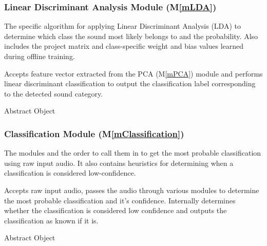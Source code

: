 \documentclass[12pt, titlepage]{article}
\newcommand{\mref}[1]{M\ref{#1}}
\begin{document}
\subsubsection{Linear Discriminant Analysis Module (\mref{mLDA})}
\begin{description}[labelindent=0.5cm]
  \item[Secrets:] The specific algorithm for applying Linear Discriminant
  Analysis (LDA) to determine which class the sound most likely belongs to and
  the probability. Also includes the project matrix and class-specific weight
  and bias values learned during offline training.
  \item[Services:] Accepts feature vector extracted from the PCA (\mref{mPCA})
  module and performs linear discriminant classification to output the
  classification label corresponding to the detected sound category. 
  \item[Implemented By:] \progname
  \item[Type of Module:] Abstract Object
\end{description}

\subsubsection{Classification Module (\mref{mClassification})}
\begin{description}[labelindent=0.5cm]
  \item[Secrets:] The modules and the order to call them in to get the most
  probable classification using raw input audio. It also contains heuristics for
  determining when a classification is considered low-confidence. 
  \item[Services:] Accepts raw input audio, passes the audio through various
  modules to determine the most probable classification and it's confidence.
  Internally determines whether the classification is considered low confidence
  and outputs the classification as known if it is. 
  \item[Implemented By:] \progname
  \item[Type of Module:] Abstract Object
\end{description}

\end{document}

